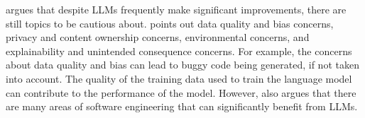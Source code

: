 \textcite{ozkayaApplicationLargeLanguage2023} argues that despite LLMs frequently make significant improvements, there are still topics to be cautious about. \citeauthor{ozkayaApplicationLargeLanguage2023} points out data quality and bias concerns, privacy and content ownership concerns, environmental concerns, and explainability and unintended consequence concerns. For example, the concerns about data quality and bias can lead to buggy code being generated, if not taken into account. The quality of the training data used to train the language model can contribute to the performance of the model. However, \citeauthor{ozkayaApplicationLargeLanguage2023} also argues that there are many areas of software engineering that can significantly benefit from LLMs.

\clearpage  %

